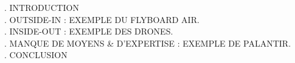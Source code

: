 \documentclass[12pt,onecolumn]{report}
\begin{document}
\thispagestyle{empty}
\setcounter{page}{0}
\newpage
\begin{center}
\end{center}
\MakeUppercase{}. INTRODUCTION\\[0.2cm]
\MakeUppercase{}. OUTSIDE-IN : EXEMPLE DU FLYBOARD AIR.\\[0.2cm]
\MakeUppercase{}. INSIDE-OUT : EXEMPLE DES DRONES.\\[0.2cm]
\MakeUppercase{}. MANQUE DE MOYENS \& D'EXPERTISE : EXEMPLE DE PALANTIR.\\[0.2cm]
\MakeUppercase{}. CONCLUSION\\
\end{document}
